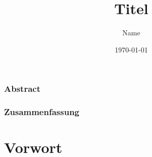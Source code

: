 \documentclass[12pt,a4paper]{scrbook} %
\author{Name}
\title{Titel}
\date{\today}
\newenvironment{abstract}{%
  \let\raggedsection\centering
  \subsection*{Abstract}%
}{\par}
\newenvironment{zusammenfassung}{%
  \let\raggedsection\centering
  \subsection*{Zusammenfassung}%
}{\par}
\begin{document}
\begin{onehalfspacing}

	
	\maketitle	
	\newpage
	
	\begin{abstract}
		\lipsum[5]
	\end{abstract}	
	\begin{zusammenfassung}
		\lipsum[6]
	\end{zusammenfassung}
	
	\tableofcontents
	\newpage
	
	\listoffigures
	\newpage
	
	\listoftables
	\newpage
		
	\chapter*{Vorwort}
		\lipsum[1]
		\newpage

	\pagestyle{fancy}
	\setcounter{page}{1} %
	
	
	
	\appendix
	
	


\end{onehalfspacing}
\end{document}
